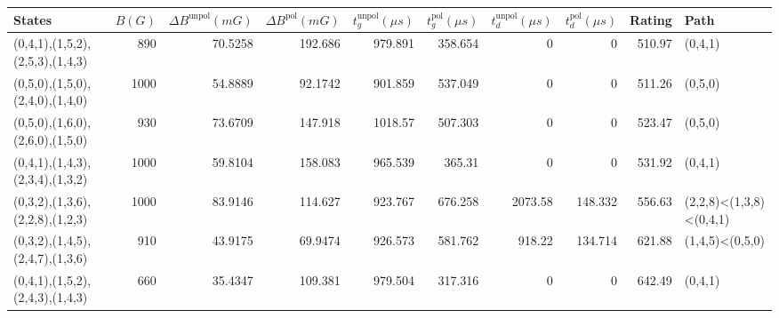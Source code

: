 \begin{tabular}{lrrrrrrrrl}
\hline
 {States}                        &   {$B(G)$} &   {$\Delta B^{\text{unpol}}(mG)$} &   {$\Delta B^{\text{pol}}(mG)$} &   {$t^{\text{unpol}}_{g}(\mu s)$} &   {$t^{\text{pol}}_{g}(\mu s)$} &   {$t^{\text{unpol}}_{d}(\mu s)$} &   {$t^{\text{pol}}_{d}(\mu s)$} &   {Rating} & {Path}                  \\
\hline
 (0,4,1),(1,5,2),(2,5,3),(1,4,3) &        890 &                           70.5258 &                        192.686  &                           979.891 &                         358.654 &                              0    &                           0     &     510.97 & (0,4,1)                 \\
 (0,5,0),(1,5,0),(2,4,0),(1,4,0) &       1000 &                           54.8889 &                         92.1742 &                           901.859 &                         537.049 &                              0    &                           0     &     511.26 & (0,5,0)                 \\
 (0,5,0),(1,6,0),(2,6,0),(1,5,0) &        930 &                           73.6709 &                        147.918  &                          1018.57  &                         507.303 &                              0    &                           0     &     523.47 & (0,5,0)                 \\
 (0,4,1),(1,4,3),(2,3,4),(1,3,2) &       1000 &                           59.8104 &                        158.083  &                           965.539 &                         365.31  &                              0    &                           0     &     531.92 & (0,4,1)                 \\
 (0,3,2),(1,3,6),(2,2,8),(1,2,3) &       1000 &                           83.9146 &                        114.627  &                           923.767 &                         676.258 &                           2073.58 &                         148.332 &     556.63 & (2,2,8)<(1,3,8)<(0,4,1) \\
 (0,3,2),(1,4,5),(2,4,7),(1,3,6) &        910 &                           43.9175 &                         69.9474 &                           926.573 &                         581.762 &                            918.22 &                         134.714 &     621.88 & (1,4,5)<(0,5,0)         \\
 (0,4,1),(1,5,2),(2,4,3),(1,4,3) &        660 &                           35.4347 &                        109.381  &                           979.504 &                         317.316 &                              0    &                           0     &     642.49 & (0,4,1)                 \\

\end{tabular}
